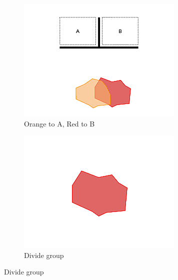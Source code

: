 \documentclass[]{article}
\begin{document}
\begin{figure}
\begin{subfigure}{0.42\textwidth}
		\includegraphics[width=\linewidth]{slide_images/Swarm_Robot_Control_-_Unknown_Number_of_Robots_0017.png}
		\caption{Orange to A, Red to B}
		\label{fig:sub1}
	\end{subfigure}%
	\begin{subfigure}{0.42\textwidth}
		\centering
		\includegraphics[width=\linewidth]{slide_images/Swarm_Robot_Control_-_Unknown_Number_of_Robots_0019.png}
		\caption{Divide group}
		\label{fig:sub2}
	\end{subfigure}
\end{figure}
\end{document}
